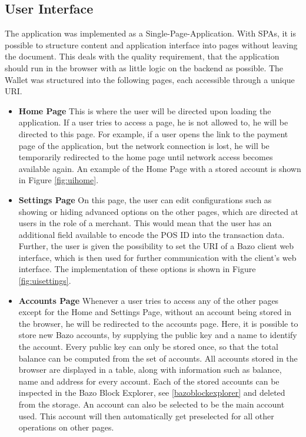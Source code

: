 \subsection{User Interface}\label{userinterface}
The application was implemented as a Single-Page-Application. With SPAs, it is possible to structure content and application interface into pages without leaving the document.
This deals with the quality requirement, that the application should run in the browser with as little logic on the backend as possible. The Wallet was structured into the following pages, each accessible through a unique URI.
\begin{itemize}
\item \textbf{Home Page}
This is where the user will be directed upon loading the application. If a user tries to access a page, he is not allowed to, he will be directed to this page. For example, if a user opens the link to the payment page of the application, but the network connection is lost, he will be temporarily redirected to the home page until network access becomes available again. An example of the Home Page with a stored account is shown in Figure \ref{fig:uihome}.
\item \textbf{Settings Page}
On this page, the user can edit configurations such as showing or hiding advanced options on the other pages, which are directed at users in the role of a merchant. This would mean that the user has an additional field available to encode the POS ID into the transaction data. Further, the user is given the possibility to set the URI of a Bazo client web interface, which is then used for further communication with the client's web interface. The implementation of these options is shown in Figure \ref{fig:uisettings}.
\item \textbf{Accounts Page}
Whenever a user tries to access any of the other pages except for the Home and Settings Page, without an account being stored in the browser, he will be redirected to the accounts page. Here, it is possible to store new Bazo accounts, by supplying the public key and a name to identify the account. Every public key can only be stored once, so that the total balance can be computed from the set of accounts. All accounts stored in the browser are displayed in a table, along with information such as balance, name and address for every account. Each of the stored accounts can be inspected in the Bazo Block Explorer, see \ref{bazoblockexplorer} and deleted from the storage. An account can also be selected to be the main account used. This account will then automatically get preselected for all other operations on other pages.

\end{itemize}
